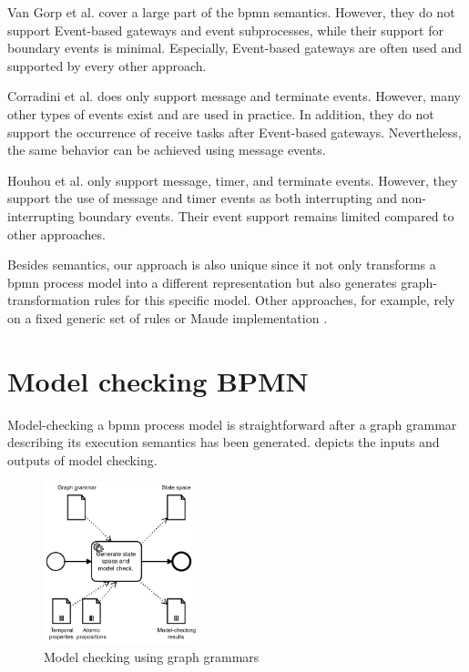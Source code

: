 \documentclass[adraft, copyright, creativecommons]{eptcs} %
\begin{document}
Van Gorp et al. \cite{vangorpVisualTokenbasedFormalization2013} cover a large part of the \gls*{bpmn} semantics.
However, they do not support Event-based gateways and event subprocesses, while their support for boundary events is minimal.
Especially, Event-based gateways are often used and supported by every other approach.

Corradini et al. \cite{corradiniFormalApproachAnalysis2021} does only support message and terminate events.
However, many other types of events exist and are used in practice.
In addition, they do not support the occurrence of receive tasks after Event-based gateways.
Nevertheless, the same behavior can be achieved using message events.

Houhou et al. only support message, timer, and terminate events.
However, they support the use of message and timer events as both interrupting and non-interrupting boundary events.
Their event support remains limited compared to other approaches.




Besides semantics, our approach is also unique since it not only transforms a \gls*{bpmn} process model into a different representation but also generates graph-transformation rules for this specific model.
Other approaches, for example, rely on a fixed generic set of rules \cite{vangorpVisualTokenbasedFormalization2013} or Maude implementation \cite{corradiniFormalApproachAnalysis2021}.
\section{Model checking BPMN}

Model-checking a \gls*{bpmn} process model is straightforward after a graph grammar describing its execution semantics has been generated.
 depicts the inputs and outputs of model checking.

\begin{figure}[h]
    \centering
    \includegraphics[width=0.4\textwidth]{images/approach-second-part.pdf}
    \caption{Model checking using graph grammars}
    \label{fig:modelChecking}
\end{figure}
\end{document}

